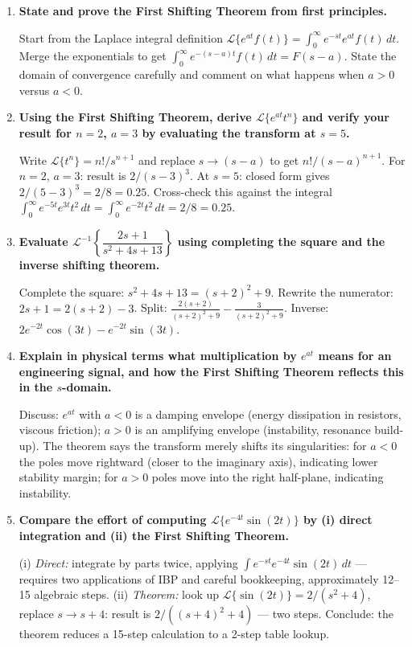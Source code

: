 \documentclass[12pt,a4paper]{article}
\begin{document}
\begin{enumerate}[label=\textbf{Q\arabic*.}, leftmargin=*, itemsep=1em]

\item \textbf{State and prove the First Shifting Theorem from first principles.}

Start from the Laplace integral definition $\mathcal{L}\{e^{at}f(t)\} = \int_0^\infty e^{-st}e^{at}f(t)\,dt$.
Merge the exponentials to get $\int_0^\infty e^{-(s-a)t}f(t)\,dt = F(s-a)$.
State the domain of convergence carefully and comment on what happens when $a > 0$ versus $a < 0$.

\item \textbf{Using the First Shifting Theorem, derive $\mathcal{L}\{e^{at}t^n\}$ and
verify your result for $n=2$, $a=3$ by evaluating the transform at $s=5$.}

Write $\mathcal{L}\{t^n\} = n!/s^{n+1}$ and replace $s \to (s-a)$ to get $n!/(s-a)^{n+1}$.
For $n=2$, $a=3$: result is $2/(s-3)^3$.
At $s=5$: closed form gives $2/(5-3)^3 = 2/8 = 0.25$.
Cross-check this against the integral $\int_0^\infty e^{-5t}e^{3t}t^2\,dt = \int_0^\infty e^{-2t}t^2\,dt = 2/8 = 0.25$.

\item \textbf{Evaluate $\mathcal{L}^{-1}\!\left\{\dfrac{2s+1}{s^2+4s+13}\right\}$ using
completing the square and the inverse shifting theorem.}

Complete the square: $s^2+4s+13 = (s+2)^2 + 9$.
Rewrite the numerator: $2s+1 = 2(s+2) - 3$.
Split: $\frac{2(s+2)}{(s+2)^2+9} - \frac{3}{(s+2)^2+9}$.
Inverse: $2e^{-2t}\cos(3t) - e^{-2t}\sin(3t)$.

\item \textbf{Explain in physical terms what multiplication by $e^{at}$ means for an engineering signal,
and how the First Shifting Theorem reflects this in the $s$-domain.}

Discuss: $e^{at}$ with $a<0$ is a damping envelope (energy dissipation in resistors, viscous friction);
$a>0$ is an amplifying envelope (instability, resonance build-up).
The theorem says the transform merely shifts its singularities: for $a<0$ the poles move rightward
(closer to the imaginary axis), indicating lower stability margin; for $a>0$ poles move into the
right half-plane, indicating instability.

\item \textbf{Compare the effort of computing $\mathcal{L}\{e^{-4t}\sin(2t)\}$ by
(i) direct integration and (ii) the First Shifting Theorem.}

(i) \textit{Direct:} integrate by parts twice, applying $\int e^{-st}e^{-4t}\sin(2t)\,dt$
--- requires two applications of IBP and careful bookkeeping, approximately 12--15 algebraic steps.
(ii) \textit{Theorem:} look up $\mathcal{L}\{\sin(2t)\} = 2/(s^2+4)$, replace $s \to s+4$:
result is $2/((s+4)^2+4)$ --- two steps.
Conclude: the theorem reduces a 15-step calculation to a 2-step table lookup.

\end{enumerate}
\end{document}
